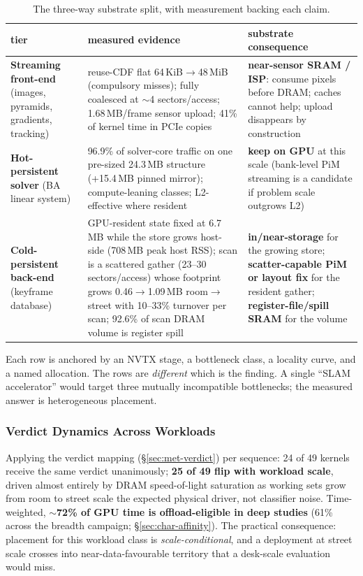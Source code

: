 \begin{table}[t]
\centering
\caption{The three-way substrate split, with measurement backing each claim.}
\label{tab:split}
\begin{tabular}{@{}p{}p{}p{}@{}}
\toprule
tier & measured evidence & substrate consequence \\
\midrule
\textbf{Streaming front-end} (images, pyramids, gradients, tracking) &
reuse-CDF flat 64\,KiB$\rightarrow$48\,MiB (compulsory misses); fully coalesced at $\sim$4 sectors/access; 1.68\,MB/frame sensor upload; 41\% of kernel time in PCIe copies &
\textbf{near-sensor SRAM / ISP}: consume pixels before DRAM; caches cannot help; upload disappears by construction \\
\addlinespace
\textbf{Hot-persistent solver} (BA linear system) &
96.9\% of solver-core traffic on one pre-sized 24.3\,MB structure (+15.4\,MB pinned mirror); compute-leaning classes; L2-effective where resident &
\textbf{keep on GPU} at this scale (bank-level PiM streaming is a candidate if problem scale outgrows L2) \\
\addlinespace
\textbf{Cold-persistent back-end} (keyframe database) &
GPU-resident state fixed at 6.7\,MB while the store grows host-side (708\,MB peak host RSS); scan is a scattered gather (23--30 sectors/access) whose footprint grows 0.46$\rightarrow$1.09\,MB room$\rightarrow$street with 10--33\% turnover per scan; 92.6\% of scan DRAM volume is register spill &
\textbf{in/near-storage} for the growing store; \textbf{scatter-capable PiM or layout fix} for the resident gather; \textbf{register-file/spill SRAM} for the volume \\
\bottomrule
\end{tabular}
\end{table}

Each row is anchored by an NVTX stage, a bottleneck class, a locality curve, and a named allocation. The rows are \emph{different} which is the finding. A single “SLAM accelerator” would target three mutually incompatible bottlenecks; the measured answer is heterogeneous placement.

\subsubsection{Verdict Dynamics Across Workloads}
\label{sec:syn-dynamics}

Applying the verdict mapping (\S\ref{sec:met-verdict}) per sequence: 24 of 49 kernels receive the same verdict unanimously; \textbf{25 of 49 flip with workload scale}, driven almost entirely by DRAM speed-of-light saturation as working sets grow from room to street scale the expected physical driver, not classifier noise. Time-weighted, \textbf{$\sim$72\% of GPU time is offload-eligible in deep studies} (61\% across the breadth campaign; \S\ref{sec:char-affinity}). The practical consequence: placement for this workload class is \emph{scale-conditional}, and a deployment at street scale crosses into near-data-favourable territory that a desk-scale evaluation would miss.

